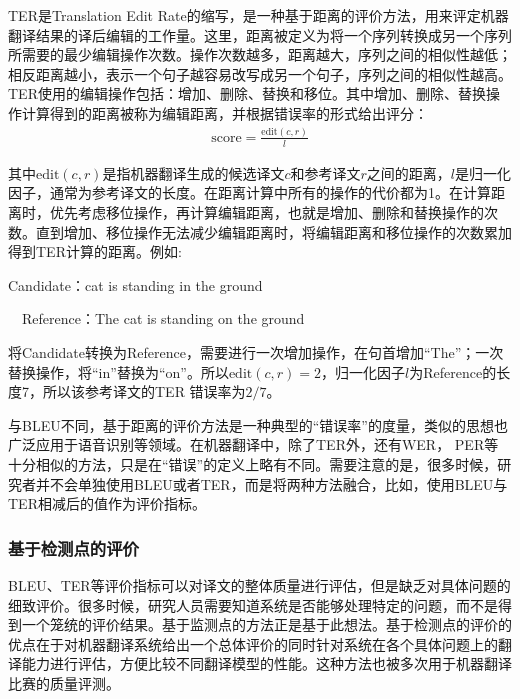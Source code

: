 \parinterval  TER是Translation Edit Rate的缩写，是一种基于距离的评价方法，用来评定机器翻译结果的译后编辑的工作量\cite{snover2006study}。这里，距离被定义为将一个序列转换成另一个序列所需要的最少编辑操作次数。操作次数越多，距离越大，序列之间的相似性越低；相反距离越小，表示一个句子越容易改写成另一个句子，序列之间的相似性越高。TER使用的编辑操作包括：增加、删除、替换和移位。其中增加、删除、替换操作计算得到的距离被称为编辑距离，并根据错误率的形式给出评分：
\begin{eqnarray}
\textrm{score}=\frac{\textrm{edit}(c,r)}{l}
\label{eq:1-5}
\end{eqnarray}

\noindent 其中$\textrm{edit}(c,r)$是指机器翻译生成的候选译文$c$和参考译文$r$之间的距离，$l$是归一化因子，通常为参考译文的长度。在距离计算中所有的操作的代价都为1。在计算距离时，优先考虑移位操作，再计算编辑距离，也就是增加、删除和替换操作的次数。直到增加、移位操作无法减少编辑距离时，将编辑距离和移位操作的次数累加得到TER计算的距离。例如:

\begin{example}
Candidate：cat is standing in the ground

\qquad \qquad \ \  Reference：The cat is standing on the ground
\label{eg:1-2}
\end{example}

\parinterval 将Candidate转换为Reference，需要进行一次增加操作，在句首增加``The''；一次替换操作，将``in''替换为``on''。所以$\textrm{edit}(c,r) = 2$，归一化因子$l$为Reference的长度7，所以该参考译文的TER 错误率为$2/7$。

\parinterval 与BLEU不同，基于距离的评价方法是一种典型的``错误率''的度量，类似的思想也广泛应用于语音识别等领域。在机器翻译中，除了TER外，还有WER， PER等十分相似的方法，只是在``错误''的定义上略有不同。需要注意的是，很多时候，研究者并不会单独使用BLEU或者TER，而是将两种方法融合，比如，使用BLEU与TER相减后的值作为评价指标。


\subsubsection{基于检测点的评价}

\parinterval  BLEU、TER等评价指标可以对译文的整体质量进行评估，但是缺乏对具体问题的细致评价。很多时候，研究人员需要知道系统是否能够处理特定的问题，而不是得到一个笼统的评价结果。基于监测点的方法正是基于此想法\cite{shiwen1993automatic}。基于检测点的评价的优点在于对机器翻译系统给出一个总体评价的同时针对系统在各个具体问题上的翻译能力进行评估，方便比较不同翻译模型的性能。这种方法也被多次用于机器翻译比赛的质量评测。

